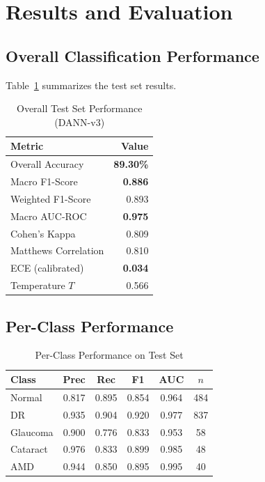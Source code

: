 \documentclass[conference]{IEEEtran}
\begin{document}
\section{Results and Evaluation}

\subsection{Overall Classification Performance}

Table~\ref{tab:overall_results} summarizes the test set results.

\begin{table}[h]
\centering
\caption{Overall Test Set Performance (DANN-v3)}
\label{tab:overall_results}
\begin{tabular}{lr}
\toprule
\textbf{Metric} & \textbf{Value} \\
\midrule
Overall Accuracy & \textbf{89.30\%} \\
Macro F1-Score & \textbf{0.886} \\
Weighted F1-Score & 0.893 \\
Macro AUC-ROC & \textbf{0.975} \\
Cohen's Kappa & 0.809 \\
Matthews Correlation & 0.810 \\
ECE (calibrated) & \textbf{0.034} \\
Temperature $T$ & 0.566 \\
\bottomrule
\end{tabular}
\end{table}

\subsection{Per-Class Performance}

\begin{table}[h]
\centering
\caption{Per-Class Performance on Test Set}
\label{tab:perclass}
\begin{tabular}{lccccc}
\toprule
\textbf{Class} & \textbf{Prec} & \textbf{Rec} & \textbf{F1} & \textbf{AUC} & \textbf{$n$} \\
\midrule
Normal & 0.817 & 0.895 & 0.854 & 0.964 & 484 \\
DR & 0.935 & 0.904 & 0.920 & 0.977 & 837 \\
Glaucoma & 0.900 & 0.776 & 0.833 & 0.953 & 58 \\
Cataract & 0.976 & 0.833 & 0.899 & 0.985 & 48 \\
AMD & 0.944 & 0.850 & 0.895 & 0.995 & 40 \\
\bottomrule
\end{tabular}
\end{table}
\end{document}
